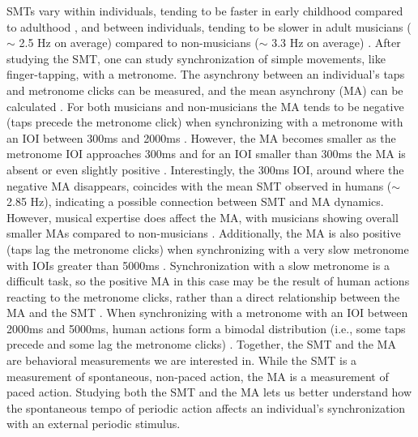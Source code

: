 \documentclass[10pt,letterpaper]{article}
\begin{document}
SMTs vary within individuals, tending to be faster in early childhood compared to adulthood \cite{mcauley2006time}, and between individuals, tending to be slower in adult musicians ($\sim$ 2.5 Hz on average) compared to non-musicians ($\sim$ 3.3 Hz on average) \cite{scheurich2016spontaneous, drake2000tapping}. After studying the SMT, one can study synchronization of simple movements, like finger-tapping, with a metronome. The asynchrony between an individual's taps and metronome clicks can be measured, and the mean asynchrony (MA) can be calculated \cite{repp2005sensorimotor, repp2013sensorimotor}. For both musicians and non-musicians the MA tends to be negative (taps precede the metronome click) when synchronizing with a metronome with an IOI between 300ms and 2000ms \cite{mates1994temporal}. However, the MA becomes smaller as the metronome IOI approaches 300ms and for an IOI smaller than 300ms the MA is absent or even slightly positive \cite{repp2003rate, wohlschlager1999synchronization}. Interestingly, the 300ms IOI, around where the negative MA disappears, coincides with the mean SMT observed in humans ($\sim$ 2.85 Hz), indicating a possible connection between SMT and MA dynamics. However, musical expertise does affect the MA, with musicians showing overall smaller MAs compared to non-musicians \cite{repp2007tapping}. Additionally, the MA is also positive (taps lag the metronome clicks) when synchronizing with a very slow metronome with IOIs greater than 5000ms \cite{miyake2004two}. Synchronization with a slow metronome is a difficult task, so the positive MA in this case may be the result of human actions reacting to the metronome clicks, rather than a direct relationship between the MA and the SMT \cite{repp2007tapping}. When synchronizing with a metronome with an IOI between 2000ms and 5000ms, human actions form a bimodal distribution (i.e., some taps precede and some lag the metronome clicks) \cite{baaaath2016estimating}. Together, the SMT and the MA are behavioral measurements we are interested in. While the SMT is a measurement of spontaneous, non-paced action, the MA is a measurement of paced action. Studying both the SMT and the MA lets us better understand how the spontaneous tempo of periodic action affects an individual's synchronization with an external periodic stimulus.
\end{document}
